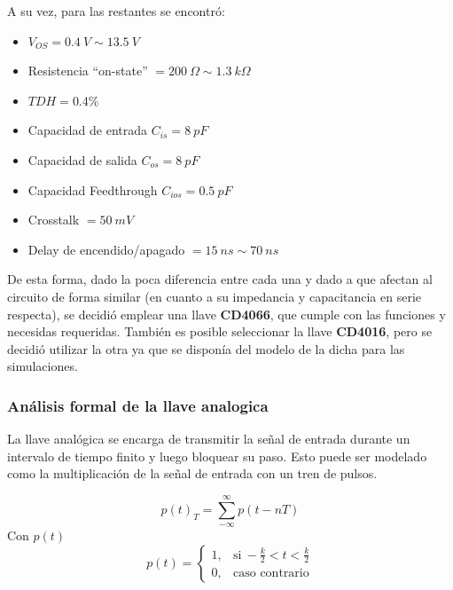 A su vez, para las restantes se encontró:
\begin{multicols}{2}
\begin{itemize}
	\item $V_{OS} = 0.4 \ V \sim 13.5 \ V$
	\item Resistencia ``on-state'' $= 200 \ \Omega \sim 1.3 \ k\Omega$
	\item $TDH = 0.4\%$
	\item Capacidad de entrada $C_{is} = 8 \ pF$
	\item Capacidad de salida $C_{os} = 8 \ pF$
	\item Capacidad Feedthrough $C_{ios} = 0.5 \ pF$
	\item Crosstalk $= 50 \ mV$
	\item Delay de encendido/apagado $= 15 \ ns \sim 70 \ ns$
\end{itemize}
\end{multicols}

De esta forma, dado la poca diferencia entre cada una y dado a que afectan al circuito de forma similar (en cuanto a su impedancia y capacitancia en serie respecta), se decidió emplear una llave \textbf{CD4066}, que cumple con las funciones y necesidas requeridas. También es posible seleccionar la llave \textbf{CD4016}, pero se decidió utilizar la otra ya que se disponía del modelo de la dicha para las simulaciones.

\subsubsection{Análisis formal de la llave analogica}
La llave analógica se encarga de transmitir la señal de entrada durante un intervalo de tiempo finito y luego bloquear su paso. Esto puede ser modelado como la multiplicación de la señal de entrada con un tren de pulsos.
 
 \begin{equation}
 p(t)_{T} = \sum_{-\infty}^{\infty}p(t-nT)
 \end{equation}
 Con $p(t)$
  \begin{equation}
p(t)=
\begin{cases}
1, & \text{si}\ -\frac{k}{2}<t<\frac{k}{2} \\
0, & \text{caso contrario}
\end{cases}
\end{equation}

